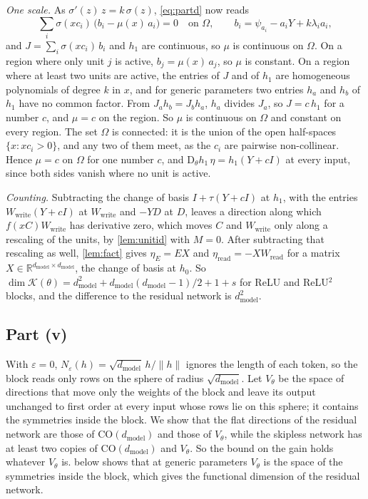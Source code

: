 \documentclass[10pt]{article}
\theoremstyle{definition}
\theoremstyle{remark}
\newcommand{\R}{\mathbb{R}}
\newcommand{\Wread}{W_{\mathrm{read}}}
\newcommand{\Wwrite}{W_{\mathrm{write}}}
\newcommand{\dm}{d_{\mathrm{model}}}
\newcommand{\CO}{\mathrm{CO}}
\newcommand{\Der}{\mathrm{D}}
\newcommand{\norm}[1]{\lVert #1\rVert}
\begin{document}
\emph{One scale.} As $\sigma'(z)\,z = k\,\sigma(z)$, \cref{eq:partd} now reads
\[
\sum_i \sigma(xc_i)\,\big(b_i - \mu(x)\,a_i\big) = 0 \quad\text{on } \Omega, \qquad b_i = \psi_{a_i} - a_iY + k\lambda_ia_i,
\]
and $J = \sum_i\sigma(xc_i)\,b_i$ and $h_1$ are continuous, so $\mu$ is continuous on $\Omega$. On a region where only unit $j$ is active, $b_j = \mu(x)\,a_j$, so $\mu$ is constant. On a region where at least two units are active, the entries of $J$ and of $h_1$ are homogeneous polynomials of degree $k$ in $x$, and for generic parameters two entries $h_a$ and $h_b$ of $h_1$ have no common factor. From $J_ah_b = J_bh_a$, $h_a$ divides $J_a$, so $J = c\,h_1$ for a number $c$, and $\mu = c$ on the region. So $\mu$ is continuous on $\Omega$ and constant on every region. The set $\Omega$ is connected: it is the union of the open half-spaces $\{x : xc_i > 0\}$, and any two of them meet, as the $c_i$ are pairwise non-collinear. Hence $\mu = c$ on $\Omega$ for one number $c$, and $\Der_\theta h_1\,\eta = h_1(Y + cI)$ at every input, since both sides vanish where no unit is active.

\emph{Counting.} Subtracting the change of basis $I + \tau(Y + cI)$ at $h_1$, with the entries $\Wwrite(Y + cI)$ at $\Wwrite$ and $-YD$ at $D$, leaves a direction along which $f(xC)\Wwrite$ has derivative zero, which moves $C$ and $\Wwrite$ only along a rescaling of the units, by \cref{lem:unitid} with $M = 0$. After subtracting that rescaling as well, \cref{lem:fact} gives $\eta_E = EX$ and $\eta_{\mathrm{read}} = -X\Wread$ for a matrix $X \in \R^{\dm\times\dm}$, the change of basis at $h_0$. So $\dim\mathcal K(\theta) = \dm^2 + \dm(\dm-1)/2 + 1 + s$ for ReLU and ReLU$^2$ blocks, and the difference to the residual network is $\dm^2$.

\subsection*{Part (v)}

With $\varepsilon = 0$, $N_\varepsilon(h) = \sqrt{\dm}\,h/\norm{h}$ ignores the length of each token, so the block reads only rows on the sphere of radius $\sqrt{\dm}$. Let $V_\theta$ be the space of directions that move only the weights of the block and leave its output unchanged to first order at every input whose rows lie on this sphere; it contains the symmetries inside the block. We show that the flat directions of the residual network are those of $\CO(\dm)$ and those of $V_\theta$, while the skipless network has at least two copies of $\CO(\dm)$ and $V_\theta$. So the bound on the gain holds whatever $V_\theta$ is.  below shows that at generic parameters $V_\theta$ is the space of the symmetries inside the block, which gives the functional dimension of the residual network.
\end{document}
